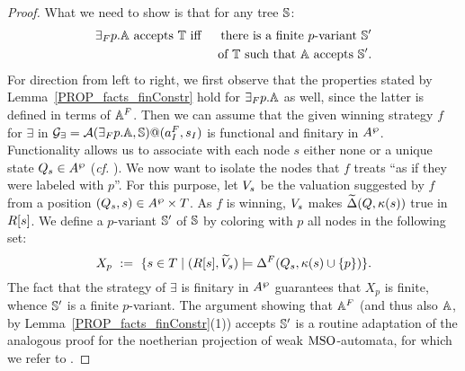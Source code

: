 \begin{proof}
What we need to show is that for any tree $\mathbb{S}$:
\begin{eqnarray*}
  {{\exists}_F p}.\mb{A} \text{ accepts } \mathbb{T} & \text{ iff }& \text{there is a finite $p$-variant }\model' \\
   & & \text{of }\mathbb{T}\text{  such that }\aut\text{  accepts }\model'.
\end{eqnarray*}
For direction from left to right, we first observe that the properties stated by Lemma~\ref{PROP_facts_finConstr} hold for ${{\exists}_F p}.\mathbb{A}$ as well, since the latter is defined in terms of $\mathbb{A}^{F}$. Then we can assume that the given winning strategy $f$ for $\exists$ in $\mathcal{G_{\exists}} = \mathcal{A}({{\exists}_F p}.\mathbb{A},\mathbb{S})@(a_I^{F},s_I)$ is functional and finitary in $A^{\wp}$. Functionality allows us to associate with each node $s$ either none or a unique state $Q_s \in A^{\wp}$ (\emph{cf.} \cite[Prop. 3.12]{Zanasi:Thesis:2012}). We now want to isolate  the nodes that $f$ treats ``as if they were labeled with $p$''. For this purpose, let $V_{s}$ be the valuation suggested by $f$ from a position $(Q_s,s) \in A^{\wp} \times T$. As $f$ is winning, $V_{s}$ makes $\widetilde{\Delta}(Q,\kappa(s))$ true in $R[s]$. We define a $p$-variant $\mathbb{S}'$ of $\mathbb{S}$ by coloring with $p$ all nodes in the following set:
 \begin{equation}\label{eq:X_p}
   X_p\ :=\ \{s \in T\mid (\R{s},\widetilde{\val}_{s}) \models \Delta^{\f}(Q_s,\tscolors(s)\cup\{p\})\}.
\end{equation}
The fact that the strategy of $\exists$ is finitary in $A^{\wp}$ guarantees that $X_p$ is finite, whence $\mathbb{S}'$ is a finite $p$-variant. The argument showing that $\mathbb{A}^{F}$ (and thus also $\mathbb{A}$, by Lemma~\ref{PROP_facts_finConstr}(1)) accepts $\mathbb{S}'$ is a routine adaptation of the analogous proof for the noetherian projection of weak $\mathrm{MSO}$-automata, for which we refer to \cite[Prop. 3.12]{Zanasi:Thesis:2012}.
\medskip


\end{proof}
